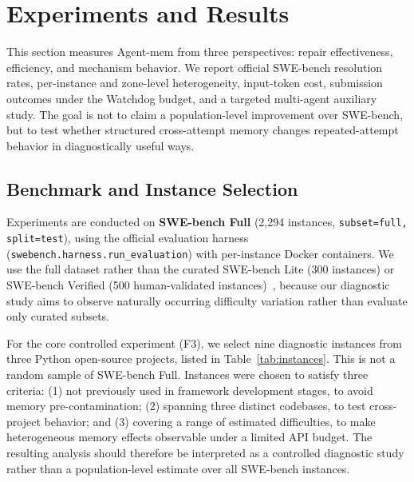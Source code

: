 \documentclass[runningheads]{llncs}
\begin{document}
\section{Experiments and Results}

This section measures Agent-mem from three perspectives: repair effectiveness, efficiency, and mechanism behavior. We report official SWE-bench resolution rates, per-instance and zone-level heterogeneity, input-token cost, submission outcomes under the Watchdog budget, and a targeted multi-agent auxiliary study. The goal is not to claim a population-level improvement over SWE-bench, but to test whether structured cross-attempt memory changes repeated-attempt behavior in diagnostically useful ways.

\subsection{Benchmark and Instance Selection}

Experiments are conducted on \textbf{SWE-bench Full} (2,294 instances, \texttt{subset=full, split=test}), using the official evaluation harness (\texttt{swebench.harness.run\_evaluation}) with per-instance Docker containers. We use the full dataset rather than the curated SWE-bench Lite (300 instances) or SWE-bench Verified (500 human-validated instances)~\cite{chowdhury2024swebenchverified}, because our diagnostic study aims to observe naturally occurring difficulty variation rather than evaluate only curated subsets.

For the core controlled experiment (F3), we select nine diagnostic instances from three Python open-source projects, listed in Table~\ref{tab:instances}. This is not a random sample of SWE-bench Full. Instances were chosen to satisfy three criteria: (1) not previously used in framework development stages, to avoid memory pre-contamination; (2) spanning three distinct codebases, to test cross-project behavior; and (3) covering a range of estimated difficulties, to make heterogeneous memory effects observable under a limited API budget. The resulting analysis should therefore be interpreted as a controlled diagnostic study rather than a population-level estimate over all SWE-bench instances.
\end{document}
